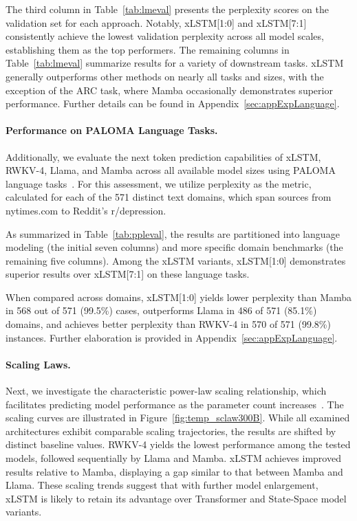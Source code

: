The third column in Table~\ref{tab:lmeval} presents the perplexity scores on the validation set for each approach. Notably, xLSTM[1:0] and xLSTM[7:1] consistently achieve the lowest validation perplexity across all model scales, establishing them as the top performers. The remaining columns in Table~\ref{tab:lmeval} summarize results for a variety of downstream tasks. xLSTM generally outperforms other methods on nearly all tasks and sizes, with the exception of the ARC task, where Mamba occasionally demonstrates superior performance. Further details can be found in Appendix~\ref{sec:appExpLanguage}.

\paragraph{Performance on PALOMA Language Tasks.} Additionally, we evaluate the next token prediction capabilities of xLSTM, RWKV-4, Llama, and Mamba across all available model sizes using PALOMA language tasks~\citep{Magnusson:23arxivshort}. For this assessment, we utilize perplexity as the metric, calculated for each of the 571 distinct text domains, which span sources from nytimes.com to Reddit’s r/depression.

As summarized in Table~\ref{tab:ppleval}, the results are partitioned into language modeling (the initial seven columns) and more specific domain benchmarks (the remaining five columns). Among the xLSTM variants, xLSTM[1:0] demonstrates superior results over xLSTM[7:1] on these language tasks.

When compared across domains, xLSTM[1:0] yields lower perplexity than Mamba in 568 out of 571 (99.5\%) cases, outperforms Llama in 486 of 571 (85.1\%) domains, and achieves better perplexity than RWKV-4 in 570 of 571 (99.8\%) instances. Further elaboration is provided in Appendix~\ref{sec:appExpLanguage}.

\paragraph{Scaling Laws.} Next, we investigate the characteristic power-law scaling relationship, which facilitates predicting model performance as the parameter count increases~\citep{Kaplan:20,Brown:20short}. The scaling curves are illustrated in Figure~\ref{fig:temp_sclaw300B}. While all examined architectures exhibit comparable scaling trajectories, the results are shifted by distinct baseline values. RWKV-4 yields the lowest performance among the tested models, followed sequentially by Llama and Mamba. xLSTM achieves improved results relative to Mamba, displaying a gap similar to that between Mamba and Llama. These scaling trends suggest that with further model enlargement, xLSTM is likely to retain its advantage over Transformer and State-Space model variants.

